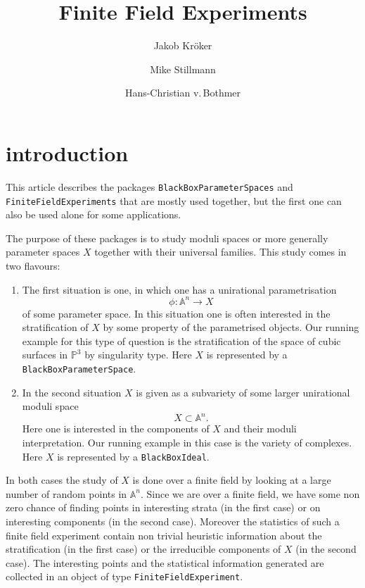 \documentclass[12pt,a4paper]{amsart}
\theoremstyle{plain}
\theoremstyle{definition}
\renewcommand{\AA}{\mathbb A}
\newcommand{\PP}{\mathbb P}
\begin{document}
\title{Finite Field Experiments}

\author{Jakob Kr\"oker}
\author{Mike Stillmann}
\author{Hans-Christian v.\,Bothmer}

\maketitle

\section{introduction}

This article describes the packages {\tt BlackBoxParameterSpaces}  and
 {\tt FiniteFieldExperiments} that are mostly used together, but the first one can also be used alone for some applications.

The purpose of these packages is to study moduli spaces or more generally parameter spaces $X$ together with their universal families. This study comes in two flavours:

\begin{enumerate}
\item The first situation is one, in which one has a unirational parametrisation 
\[
	\phi \colon \AA^n \to X
\]
of some parameter space. In this situation one is often interested in the stratification of $X$ by some property of the parametrised objects. Our running example for this type of question is the stratification of the space of cubic surfaces in $\PP^3$ by singularity type. Here $X$ is represented by a {\tt BlackBoxParameterSpace}.

\item In the second situation $X$ is given as a subvariety of some larger unirational moduli space
\[
	X \subset \AA^n.
\]
Here one is interested in the components of $X$ and their moduli interpretation. Our running example in this case is the variety of complexes. Here $X$ is represented by a {\tt BlackBoxIdeal}.
\end{enumerate}

In both cases the study of $X$ is done over a finite field by looking at a large number of random points in $\AA^n$. Since we are over a finite field, we have some non zero chance of finding points in interesting strata (in the first case) or on interesting components (in the second case). Moreover the statistics of such a finite field experiment contain non trivial heuristic information about the stratification (in the first case) or the irreducible components of $X$ (in the second case). The interesting points and the statistical information generated are collected in an object of type {\tt FiniteFieldExperiment}.
\end{document}
